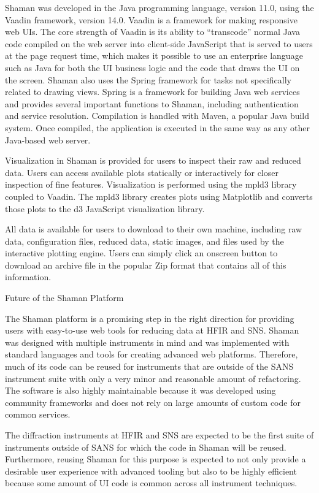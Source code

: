 Shaman was developed in the Java programming language, version 11.0, using the Vaadin framework,
version 14.0. Vaadin is a framework for making responsive web UIs. The core strength of Vaadin is
its ability to “transcode” normal Java code compiled on the web server into client-side JavaScript
that is served to users at the page request time, which makes it possible to use an enterprise
language such as Java for both the UI business logic and the code that draws the UI on the screen.
Shaman also uses the Spring framework for tasks not specifically related to drawing views. Spring is
a framework for building Java web services and provides several important functions to Shaman,
including authentication and service resolution. Compilation is handled with Maven, a popular Java
build system. Once compiled, the application is executed in the same way as any other Java-based web
server.

Visualization in Shaman is provided for users to inspect their raw and reduced data. Users can
access available plots statically or interactively for closer inspection of fine features.
Visualization is performed using the mpld3 library coupled to Vaadin. The mpld3 library creates
plots using Matplotlib and converts those plots to the d3 JavaScript visualization library.

All data is available for users to download to their own machine, including raw data, configuration
files, reduced data, static images, and files used by the interactive plotting engine. Users can
simply click an onscreen button to download an archive file in the popular Zip format that contains
all of this information.

Future of the Shaman Platform

The Shaman platform is a promising step in the right direction for providing users with easy-to-use
web tools for reducing data at HFIR and SNS. Shaman was designed with multiple instruments in mind
and was implemented with standard languages and tools for creating advanced web platforms.
Therefore, much of its code can be reused for instruments that are outside of the SANS instrument
suite with only a very minor and reasonable amount of refactoring. The software is also highly
maintainable because it was developed using community frameworks and does not rely on large amounts
of custom code for common services.

The diffraction instruments at HFIR and SNS are expected to be the first suite of instruments
outside of SANS for which the code in Shaman will be reused. Furthermore, reusing Shaman for this
purpose is expected to not only provide a desirable user experience with advanced tooling but also
to be highly efficient because some amount of UI code is common across all instrument techniques.

